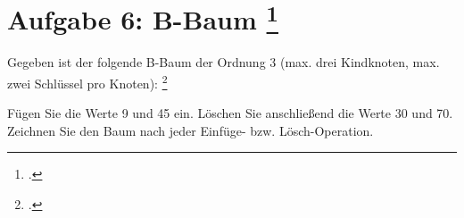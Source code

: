\documentclass{lehramt-informatik-aufgabe}
\begin{document}

\section{Aufgabe 6: B-Baum
\footcite[Thema 2 Teilaufgabe 1 Aufgabe 3]{66116:2015:09}
}

Gegeben ist der folgende B-Baum der Ordnung 3 (max. drei Kindknoten,
max. zwei Schlüssel pro Knoten):
\footcite[Seite 3 und 4,  (Einfügen und Löschen-Operation a)]{aud:ab:7}


\noindent
Fügen Sie die Werte 9 und 45 ein. Löschen Sie anschließend die Werte 30
und 70. Zeichnen Sie den Baum nach jeder Einfüge- bzw. Lösch-Operation.
\end{document}
